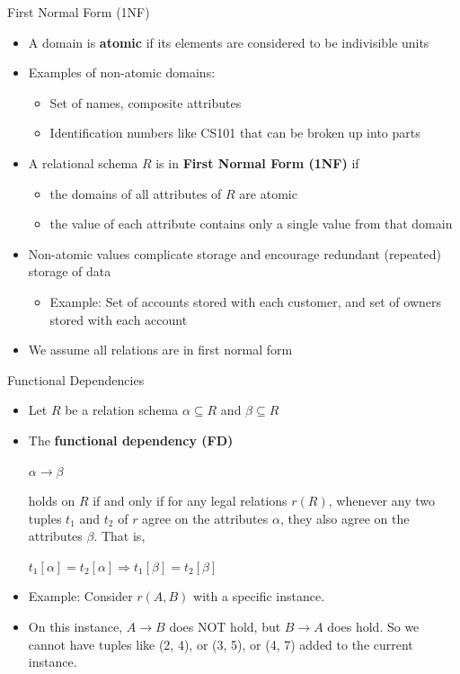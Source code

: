 \documentclass[aspectratio=169, xcolor=dvipsnames]{beamer}
\begin{document}
\begin{frame}{First Normal Form (1NF)}
    \begin{itemize}[<+->]
        \item A domain is \textbf{atomic} if its elements are considered to be indivisible units
        \item Examples of non-atomic domains:
        \begin{itemize}
            \item[$\triangleright$] Set of names, composite attributes
            \item[$\triangleright$] Identification numbers like CS101 that can be broken up into parts
        \end{itemize}
        \item A relational schema $R$ is in \textbf{First Normal Form (1NF)} if
        \begin{itemize}
            \item[$\triangleright$] the domains of all attributes of $R$ are atomic
            \item[$\triangleright$] the value of each attribute contains only a single value from that domain
        \end{itemize}
        \item Non-atomic values complicate storage and encourage redundant (repeated) storage of data
        \begin{itemize}
            \item[$\triangleright$] Example: Set of accounts stored with each customer, and set of owners stored with each account
        \end{itemize}
        \item We assume all relations are in first normal form
    \end{itemize}
\end{frame}

\begin{frame}{Functional Dependencies}
    \begin{itemize}[<+->]
        \item Let $R$ be a relation schema $\alpha \subseteq R$ and $\beta \subseteq R$
        \item The \textbf{functional dependency (FD)}
        \begin{center}
            $\alpha \rightarrow \beta$
        \end{center}
        holds on $R$ if and only if for any legal relations $r(R)$, whenever any two tuples $t_1$ and $t_2$ of $r$ agree on the attributes $\alpha$, they also agree on the attributes $\beta$. That is,
        \begin{center}
            $t_1[\alpha] = t_2[\alpha] \Rightarrow t_1[\beta] = t_2[\beta]$
        \end{center}
        \item Example: Consider $r(A, B)$ with a specific instance.
        \item On this instance, $A \rightarrow B$ does NOT hold, but $B \rightarrow A$ does hold. So we cannot have tuples like (2, 4), or (3, 5), or (4, 7) added to the current instance.
    \end{itemize}
\end{frame}
\end{document}
